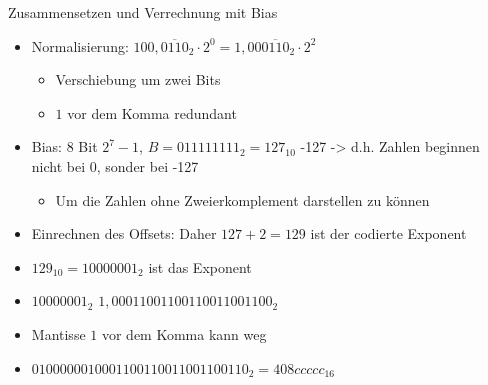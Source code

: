 \documentclass[12pt%
,xcolor=table
,aspectratio=169%
]{beamer}
\begin{document}
\begin{frame}{Zusammensetzen und Verrechnung mit Bias}
\begin{itemize}
	\item  Normalisierung: $100, \overline{0110}_2 \cdot 2^0 = 1,00 \overline{0110}_2 \cdot 2^2$
	\begin{itemize}
		\item Verschiebung um zwei Bits
		\item $1$ vor dem Komma redundant
	\end{itemize}
	\item Bias: 8 Bit $2^7-1$, $B = 011111111_2 = 127_{10}$
	 -127 -> d.h. Zahlen beginnen nicht bei 0, sonder bei -127
	\begin{itemize}
		\item Um die Zahlen ohne Zweierkomplement darstellen zu können
	\end{itemize}
	\item Einrechnen des Offsets: Daher $127 + 2 = 129$ ist der codierte Exponent	
	\item $129_{10} = 10000001_2$ ist das Exponent
	\item $10000001_2$ $1,00011001100110011001100_2$
	\item Mantisse $1$ vor dem Komma kann weg
	\item $0100000010001100110011001100110_2 = 408ccccc_{16}$
\end{itemize}
\end{frame}
\end{document}
